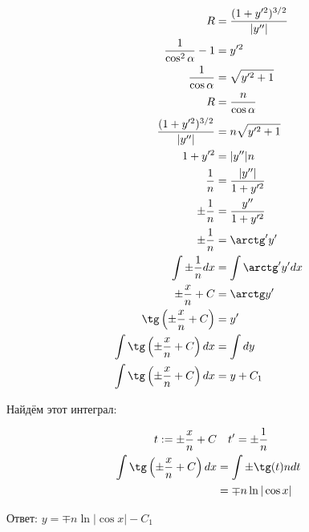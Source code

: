 \begin{align*}
    R                                         & = \frac{(1+y'^2)^{3/2}}{|y''|} \\
    \frac{1}{\cos^2 \alpha} - 1               & = y'^2                         \\
    \frac{1}{\cos \alpha}                     & = \sqrt{y'^2 + 1}              \\
    R                                         & = \frac{n}{\cos \alpha}        \\
    \frac{(1+y'^2)^{3/2}}{|y''|}              & = n\sqrt{y'^2 + 1}             \\
    1+y'^2                                    & = |y''|n                       \\
    \frac{1}{n}                               & = \frac{|y''|}{1+y'^2}         \\
    \pm\frac{1}{n}                            & = \frac{y''}{1+y'^2}           \\
    \pm\frac{1}{n}                            & = \arctg' y'                   \\
    \int \pm\frac{1}{n} dx                    & = \int \arctg' y' dx           \\
    \pm\frac{x}{n} + C                        & = \arctg y'                    \\
    \tg\left(\pm\frac{x}{n} + C\right)        & = y'                           \\
    \int \tg\left(\pm\frac{x}{n} + C\right)dx & = \int dy                      \\
    \int \tg\left(\pm\frac{x}{n} + C\right)dx & = y + C_1                      \\
\end{align*}

Найдём этот интеграл:

\begin{align*}
    t := \pm\frac{x}{n} + C                   & \quad t' = \pm\frac{1}{n} \\
    \int \tg\left(\pm\frac{x}{n} + C\right)dx & = \int \pm \tg (t) n dt   \\
                                              & = \mp n\ln|\cos x|        \\
\end{align*}

Ответ: $y = \mp n\ln|\cos x| - C_1$

